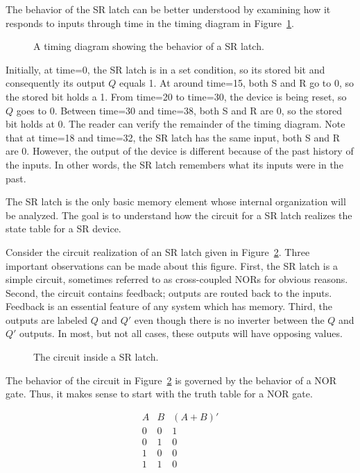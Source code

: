The behavior of the SR latch can be better understood
by examining how it responds to inputs through time in the
timing diagram in Figure~\ref{fig:sequentialCirSRLtime}.

\begin{figure}[ht]
\caption{A timing diagram showing the behavior of a
SR latch.}
\label{fig:sequentialCirSRLtime}
\end{figure}

Initially, at time=0, the SR latch is in a set condition, so its
stored bit and consequently its output $Q$ equals 1.  At around
time=15, both S and R go to 0, so the stored bit holds a 1.  From
time=20 to time=30, the device is being reset, so $Q$ goes to 0.  Between
time=30 and time=38, both S and R are 0, so the stored bit holds at 0.
The reader can verify the remainder of the timing diagram.
Note that at time=18 and time=32, the SR latch has the same input, both
S and R are 0.  However, the output of the device is different because
of the past history of the inputs.  In other words, the SR latch
remembers what its inputs were in the past.

The SR latch is the only basic memory element whose internal
organization will be analyzed.  The goal is to understand how
the circuit for a SR latch realizes the state table for a SR
device.

Consider the circuit realization of an SR latch
given in Figure~\ref{fig:sequentialCirSRL}.  Three important
observations can be made about this figure. First, the SR
latch is a simple circuit, sometimes referred to as cross-coupled
NORs for obvious reasons.  Second, the circuit contains feedback;
outputs are routed back to the inputs.  Feedback is an essential
feature of any system which has memory.  Third, the outputs are
labeled $Q$ and $Q'$ even though there is no inverter between the
$Q$ and $Q'$ outputs.  In most, but not all cases, these
outputs will have opposing values.

\begin{figure}[ht]
\caption{The circuit inside a SR latch.}
\label{fig:sequentialCirSRL}
\end{figure}

The behavior of the circuit in Figure~\ref{fig:sequentialCirSRL} is governed
by the behavior of a NOR gate.  Thus, it makes sense to start with
the truth table for a NOR gate.

$$
\begin{array}{c|c||c}
A  & B  & (A+B)'  \\ \hline
0  & 0  & 1  \\ \hline
0  & 1  & 0  \\ \hline
1  & 0  & 0  \\ \hline
1  & 1  & 0  \\
\end{array}$$

